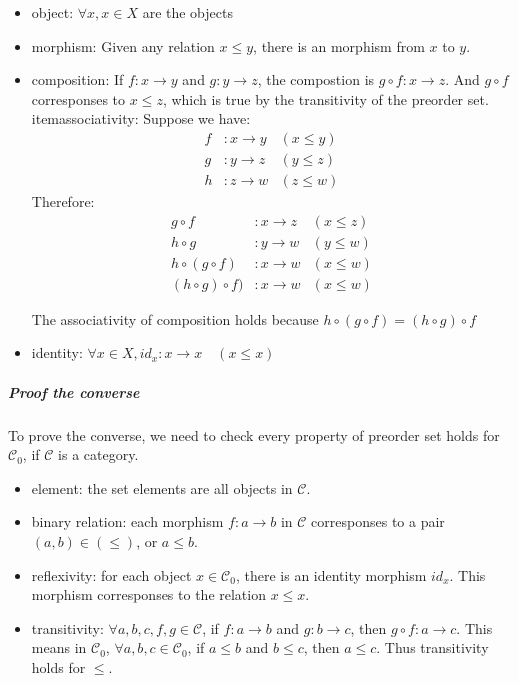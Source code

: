 \documentclass[11pt]{article}
\begin{document}
\begin{itemize}
\item{object}: $\forall x, x \in X$ are the objects
\item{morphism}: Given any relation $x \le y$,
there is an morphism from $x$ to $y$.
\item{composition}: If $f: x \rightarrow y$ and $g: y \rightarrow z$,
the compostion is $g \circ f: x \rightarrow z$. And $g \circ f$ corresponses to
$x \le z$, which is true by the transitivity of the preorder set.
item{associativity}: Suppose we have:
\begin{align*}
f &: x \rightarrow y & (x \le y) \\
g &: y \rightarrow z & (y \le z) \\
h &: z \rightarrow w & (z \le w)
\end{align*}
Therefore:
\begin{align*}
g \circ f &: x \rightarrow z & (x \le z) \\
h \circ g &: y \rightarrow w & (y \le w) \\
h \circ (g \circ f) &: x \rightarrow w & (x \le w) \\
(h \circ g) \circ f) &: x \rightarrow w & (x \le w)
\end{align*}

The associativity of composition holds because
$h \circ (g \circ f) = (h \circ g) \circ f$
\item{identity}: $\forall x \in X, id_x: x \rightarrow x \quad (x \le x)$
\end{itemize}

\subparagraph{Proof the converse}

To prove the converse, we need to check every property of preorder set holds for
$\mathcal{C}_0$, if $\mathcal{C}$ is a category.

\begin{itemize}
\item{element}: the set elements are all objects in $\mathcal{C}$.
\item{binary relation}: each morphism $f: a \rightarrow b$ in $\mathcal{C}$
corresponses to a pair $(a,b) \in (\le)$, or $a \le b$.
\item{reflexivity}: for each object $x \in \mathcal{C}_0$, there is an identity morphism
$id_x$. This morphism corresponses to the relation $x \le x$.
\item{transitivity}: $\forall a,b,c,f,g \in \mathcal{C}$, if
 $f: a \rightarrow b$ and $g: b \rightarrow c$, then $g \circ f: a \rightarrow c$.
This means in $\mathcal{C}_0$, $\forall a,b,c \in \mathcal{C}_0$,
if $a \le b$ and $b \le c$, then $a \le c$. Thus transitivity holds for $\le$.
\end{itemize}
\end{document}
